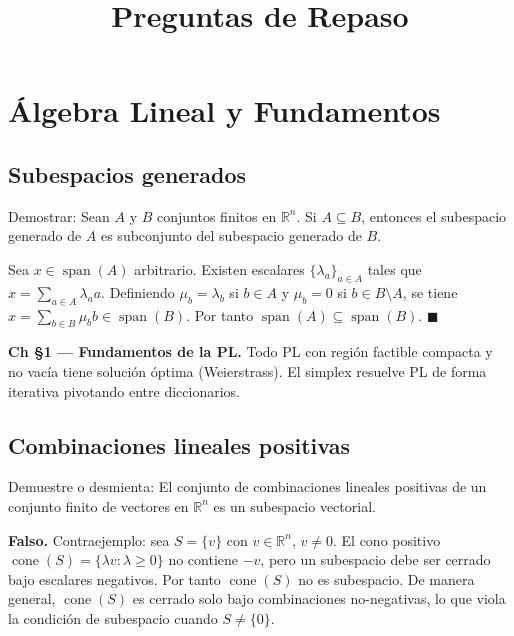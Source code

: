 \documentclass[12pt]{article}
\title{Preguntas de Repaso}
\date{}
\theoremstyle{plain}
\begin{document}
\maketitle

\tableofcontents
\newpage

\section{Álgebra Lineal y Fundamentos}

\subsection{Subespacios generados}

Demostrar: Sean $A$ y $B$ conjuntos finitos en $\mathbb{R}^n$. Si $A \subseteq B$, entonces el subespacio generado de $A$ es subconjunto del subespacio generado de $B$.

\begin{solucion}

Sea $x \in \operatorname{span}(A)$ arbitrario. Existen escalares $\{\lambda_a\}_{a \in A}$ tales que $x = \sum_{a \in A} \lambda_a a$. Definiendo $\mu_b = \lambda_b$ si $b \in A$ y $\mu_b = 0$ si $b \in B \setminus A$, se tiene $x = \sum_{b \in B} \mu_b b \in \operatorname{span}(B)$. Por tanto $\operatorname{span}(A) \subseteq \operatorname{span}(B)$. $\blacksquare$

\end{solucion}

\begin{teofund}
\textbf{Ch §1 — Fundamentos de la PL.} Todo PL con región factible compacta y no vacía tiene solución óptima (Weierstrass). El simplex resuelve PL de forma iterativa pivotando entre diccionarios.
\end{teofund}

\bigskip

\subsection{Combinaciones lineales positivas}

Demuestre o desmienta: El conjunto de combinaciones lineales positivas de un conjunto finito de vectores en $\mathbb{R}^n$ es un subespacio vectorial.

\begin{solucion}

\textbf{Falso.} Contraejemplo: sea $S = \{v\}$ con $v \in \mathbb{R}^n$, $v \neq 0$. El cono positivo $\operatorname{cone}(S) = \{\lambda v : \lambda \geq 0\}$ no contiene $-v$, pero un subespacio debe ser cerrado bajo escalares negativos. Por tanto $\operatorname{cone}(S)$ no es subespacio. De manera general, $\operatorname{cone}(S)$ es cerrado solo bajo combinaciones no-negativas, lo que viola la condición de subespacio cuando $S \neq \{0\}$.

\end{solucion}
\end{document}
